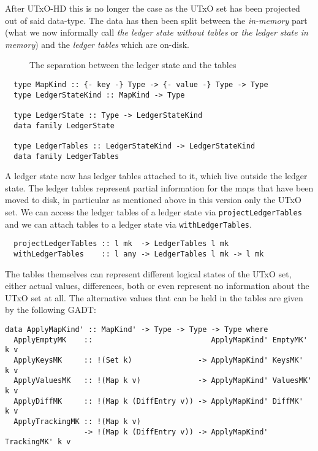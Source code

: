 \documentclass[11pt,a4paper]{article}
\theoremstyle{definition}
\begin{document}
After UTxO-HD this is no longer the case as the UTxO set has been projected out
of said data-type. The data has then been split between the \emph{in-memory}
part (what we now informally call \emph{the ledger state without tables} or
\emph{the ledger state in memory}) and the \emph{ledger tables} which are
on-disk.

\begin{figure}[h]
  \centering
  \caption{The separation between the ledger state and the tables}
\end{figure}


\begin{lstlisting}
  type MapKind :: {- key -} Type -> {- value -} Type -> Type
  type LedgerStateKind :: MapKind -> Type

  type LedgerState :: Type -> LedgerStateKind
  data family LedgerState

  type LedgerTables :: LedgerStateKind -> LedgerStateKind
  data family LedgerTables
\end{lstlisting}

A ledger state now has ledger tables attached to it, which live outside the
ledger state. The ledger tables represent partial information for the maps that
have been moved to disk, in particular as mentioned above in this version only
the UTxO set. We can access the ledger tables of a ledger state via
\texttt{projectLedgerTables} and we can attach tables to a ledger state via
\texttt{withLedgerTables}.

\begin{lstlisting}
  projectLedgerTables :: l mk  -> LedgerTables l mk
  withLedgerTables    :: l any -> LedgerTables l mk -> l mk
\end{lstlisting}

The tables themselves can represent different logical states of the UTxO set,
either actual values, differences, both or even represent no information about
the UTxO set at all. The alternative values that can be held in the tables are
given by the following GADT:

\begin{lstlisting}
data ApplyMapKind' :: MapKind' -> Type -> Type -> Type where
  ApplyEmptyMK    ::                           ApplyMapKind' EmptyMK'    k v
  ApplyKeysMK     :: !(Set k)               -> ApplyMapKind' KeysMK'     k v
  ApplyValuesMK   :: !(Map k v)             -> ApplyMapKind' ValuesMK'   k v
  ApplyDiffMK     :: !(Map k (DiffEntry v)) -> ApplyMapKind' DiffMK'     k v
  ApplyTrackingMK :: !(Map k v)
                  -> !(Map k (DiffEntry v)) -> ApplyMapKind' TrackingMK' k v
\end{lstlisting}
\end{document}
